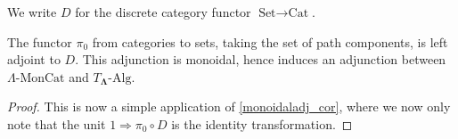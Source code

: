 \documentclass{amsbook} %
\newcommand{\Set}{\ensuremath{\textrm{Set}}}
\newcommand{\ML}{\mathbf{\Lambda}}
\newcommand{\ELn}{E\Lambda(\underline{n})}
\newcommand{\lmc}{\Lambda\mbox{-}\textrm{MonCat}}
\newcommand{\sets}{\Set}
\newcommand{\cat}{\ensuremath{\textrm{Cat}}}
\numberwithin{section}{chapter}
\begin{document}
\begin{nota}
We write $D$ for the discrete category functor $\sets \to \cat$.
\end{nota}

\begin{prop}\label{pi0-D_adj}
The functor $\pi_0$ from categories to sets, taking the set of path components, is left adjoint to  $D$. This adjunction is monoidal, hence induces an adjunction between $\lmc$ and $T_{\ML}\mbox{-}\textrm{Alg}$.
\end{prop}
\begin{proof}
This is now a simple application of \cref{monoidaladj_cor}, where we now only note that the unit $1 \Rightarrow \pi_0 \circ D$ is the identity transformation.
\end{proof}



%
\end{document}

